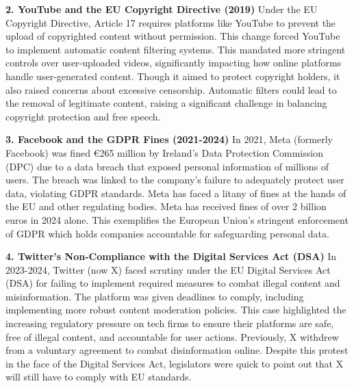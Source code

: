 \textbf{2. YouTube and the EU Copyright Directive (2019)}
Under the EU Copyright Directive, Article 17 requires platforms like YouTube to prevent the upload of copyrighted content without permission. \cite{eu2019} This change forced YouTube to implement automatic content filtering systems. This mandated more stringent controls over user-uploaded videos, significantly impacting how online platforms handle user-generated content. Though it aimed to protect copyright holders, it also raised concerns about excessive censorship. Automatic filters could lead to the removal of legitimate content, raising a significant challenge in balancing copyright protection and free speech.

\textbf{3. Facebook and the GDPR Fines (2021-2024)}
In 2021, Meta (formerly Facebook) was fined €265 million by Ireland's Data Protection Commission (DPC) due to a data breach that exposed personal information of millions of users. \cite{facebook2023} The breach was linked to the company's failure to adequately protect user data, violating GDPR standards. Meta has faced a litany of fines at the hands of the EU and other regulating bodies. Meta has received fines of over 2 billion euros in 2024 alone. \cite{FBFines} This exemplifies the European Union's stringent enforcement of GDPR which holds companies accountable for safeguarding personal data. 



\textbf{4. Twitter's Non-Compliance with the Digital Services Act (DSA)}
In 2023-2024, Twitter (now X) faced scrutiny under the EU Digital Services Act (DSA) for failing to implement required measures to combat illegal content and misinformation. \cite{twitter2023} The platform was given deadlines to comply, including implementing more robust content moderation policies. This case highlighted the increasing regulatory pressure on tech firms to ensure their platforms are safe, free of illegal content, and accountable for user actions. Previously, X withdrew from a voluntary agreement to combat disinformation online. Despite this protest in the face of the Digital Services Act, legislators were quick to point out that X will still have to comply with EU standards. \cite{bhr2023}



